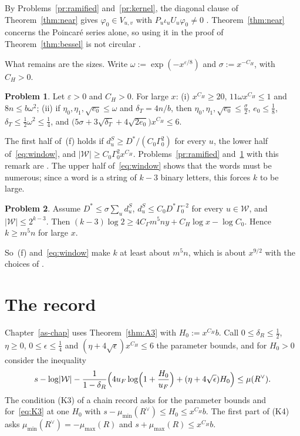 \documentclass[reqno]{amsart}
\newcounter{chap}
\theoremstyle{definition}
\newtheorem{problem}{Problem}[section]
\theoremstyle{plain}
\newcommand{\Wc}{\mathcal{W}}
\newcommand{\mumax}{\mu_{\max}}
\newcommand{\mumin}{\mu_{\min}}
\newcommand{\dS}{d^{S}}
\begin{document}
By Problems~\ref{pr:ramified} and~\ref{pr:kernel}, the diagonal clause of Theorem~\ref{thm:near} gives \(\varphi_0 \in V_{u,v}\) with \(P_u\iota_uU_u\varphi_0 \ne 0\) \cite[Lemma~14.14]{Adr}.  Theorem~\ref{thm:near} concerns the Poincar\'e series alone, so using it in the proof of Theorem~\ref{thm:bessel} is not circular \cite[Rem.~14.81]{Adr}.

What remains are the sizes.  Write \(\omega := \exp(-x^{\varepsilon/8})\) and \(\sigma := x^{-C_H}\), with \(C_H > 0\).

\begin{problem}\label{pr:sizes}
Let \(\varepsilon > 0\) and \(C_H > 0\).  For large \(x\): (i) \(x^{C_H} \ge 20\), \(11\omega x^{C_H} \le 1\) and \(8n \le b\omega^2\); (ii) if \(\eta_0, \eta_1, \sqrt{e_0} \le \omega\) and \(\delta_T = 4n/b\), then \(\eta_0, \eta_1, \sqrt{e_0} \le \frac\sigma2\), \(e_0 \le \frac18\), \(\delta_T \le \frac12\omega^2 \le \frac14\), and \(\bigl(5\sigma + 3\sqrt{\delta_T} + 4\sqrt{2e_0}\bigr)x^{C_H} \le 6\).
\end{problem}

The first half of~(f) holds if \(\dS_u \ge D^*/(C_0\Gamma_0^2)\) for every \(u\), the lower half of~\eqref{eq:window}, and \(\lvert\Wc\rvert \ge C_0\Gamma_0^2x^{C_H}\).  Problems~\ref{pr:ramified} and~\ref{pr:sizes} with this remark are \cite[Lemma~13.19]{Adr}.  The upper half of~\eqref{eq:window} shows that the words must be numerous; since a word is a string of \(k - 3\) binary letters, this forces \(k\) to be large.

\begin{problem}\label{pr:words}
Assume \(D^* \le \sigma\sum_u \dS_u\), \(\dS_u \le C_0D^*\Gamma_0^{-2}\) for every \(u \in \Wc\), and \(\lvert\Wc\rvert \le 2^{k-3}\).  Then \((k - 3)\log 2 \ge 4C_\Gamma m^5ny + C_H\log x - \log C_0\).  Hence \(k \ge m^5n\) for large \(x\).
\end{problem}

So~(f) and~\eqref{eq:window} make \(k\) at least about \(m^5n\), which is about \(x^{9/2}\) with the choices of \cite[Prop.~5.15]{Adr}.

\section{The record}\label{sec:record}

Chapter~\ref{as-chap} uses Theorem~\ref{thm:A3} with \(H_0 := x^{C_H}b\).  Call \(0 \le \delta_R \le \frac12\), \(\eta \ge 0\), \(0 \le \epsilon \le \frac14\) and \((\eta + 4\sqrt\epsilon)x^{C_H} \le 6\) the parameter bounds, and for \(H_0 > 0\) consider the inequality
\begin{equation}\label{eq:K3}
  s - \log\lvert\Wc\rvert - \frac{1}{1 - \delta_R}\Bigl(4u_F\log\Bigl(1 + \frac{H_0}{u_F}\Bigr) + (\eta + 4\sqrt\epsilon)H_0\Bigr) \le \mu(R^\vee) .
\end{equation}
The condition (K3) of a chain record \cite[Def.~18.9]{Adr} asks for the parameter bounds and for~\eqref{eq:K3} at one \(H_0\) with \(s - \mumin(R^\vee) \le H_0 \le x^{C_H}b\).  The first part of (K4) asks \(\mumin(R^\vee) = -\mumax(R)\) and \(s + \mumax(R) \le x^{C_H}b\).
\end{document}
